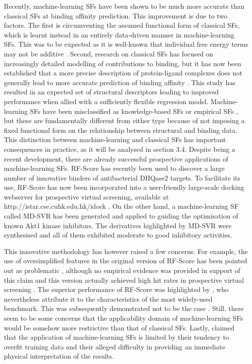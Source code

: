Recently, machine-learning SFs have been shown \citep{564} to be much more accurate than classical SFs at binding affinity prediction. This improvement is due to two factors. The first is circumventing the assumed functional form of classical SFs, which is learnt instead in an entirely data-driven manner in machine-learning SFs. This was to be expected as it is well-known that individual free energy terms may not be additive \citep{1471,1416}. Second, research on classical SFs has focused on increasingly detailed modelling of contributions to binding, but it has now been established that a more precise description of protein-ligand complexes does not generally lead to more accurate prediction of binding affinity \citep{1370}. This study has resulted in an expected set of structural descriptors leading to improved performance when allied with a sufficiently flexible regression model. Machine-learning SFs have been misclassified as knowledge-based SFs \citep{1373,1372} or empirical SFs \citep{1305}, but these are fundamentally different from either type because of not imposing a fixed functional form on the relationship between structural and binding data. This distinction between machine-learning and classical SFs has important consequences in practice, as it will be analysed in section 3.4. Despite being a recent development, there are already successful prospective applications of machine-learning SFs. RF-Score \citep{564} has recently been used \citep{1281} to discover a large number of innovative binders of antibacterial DHQase2 targets. To facilitate its use, RF-Score  has now been incorporated into a user-friendly large-scale docking webserver for prospective virtual screening, available at http://istar.cse.cuhk.edu.hk/idock \citep{1362}. On the other hand, a machine-learning SF called MD-SVR has been generated and applied \citep{1452} to guiding the optimisation of known Akt1 kinase inhibitors. The derivatives highlighted by MD-SVR were synthesised and all of them exhibited moderate to good inhibitory activities.

This innovative methodology has however raised a few concerns. For example, the use of oversimplified features in the original version of RF-Score has been pointed out as problematic \citep{1453}, although no empirical evidence was provided in support of this claim and this version actually achieved high hit rates in prospective virtual screening \citep{1281}. The superior performance of RF-Score was highlighted by \citep{774}, who nevertheless attribute it to the characteristics of the most widely-used benchmark. This was subsequently demonstrated not to be the case \citep{908}. Still, there seem to be some concerns that the applicability domain of machine-learning SFs would be somehow more restrictive than that of classical SFs. Lastly, \citep{1372} claimed that the application of machine-learning SFs is limited by their tendency to overfit training data and their alleged difficulty in providing an immediate physical interpretation of the results.

